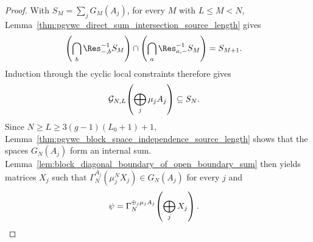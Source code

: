 \begin{proof}
    \leanok
    With $S_M=\sum_jG_M(A_j)$, for every $M$ with $L\le M<N$,
    Lemma~\ref{thm:pgvwc_direct_sum_intersection_source_length} gives
    \begin{align}
        \left(\bigcap_b\Res_{-,b}^{-1}S_M\right)
        \cap
        \left(\bigcap_a\Res_{a,-}^{-1}S_M\right)
         & =S_{M+1}.
        \notag
    \end{align}
    Induction through the cyclic local constraints therefore gives
    \begin{align}
        \mathcal G_{N,L}\!\left(\bigoplus_j\mu_jA_j\right)
         & \subseteq S_N.
        \notag
    \end{align}
    Since $N\ge L\ge3(g-1)(L_0+1)+1$,
    Lemma~\ref{thm:pgvwc_block_space_independence_source_length} shows that
    the spaces $G_N(A_j)$ form an internal sum. Lemma~\ref{lem:block_diagonal_boundary_of_open_boundary_sum}
    then yields matrices $X_j$ such that
    $\Gamma_N^{A_j}(\mu_j^NX_j)\in G_N(A_j)$ for every $j$ and
    \begin{align}
        \psi
         & =\Gamma_N^{\oplus_j\mu_jA_j}\!\left(\bigoplus_jX_j\right).
        \notag
    \end{align}
\end{proof}

